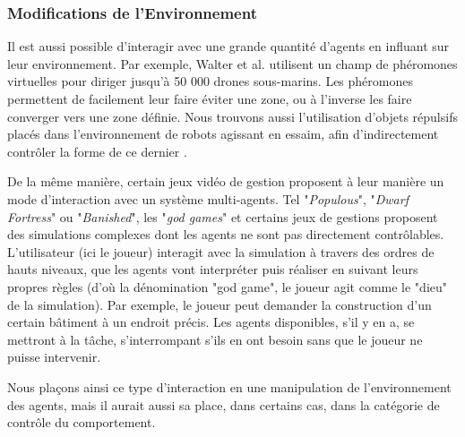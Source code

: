		
		
	\subsubsection{Modifications de l'Environnement}
		Il est aussi possible d'interagir avec une grande quantité d'agents en influant sur leur environnement. Par exemple, Walter et al. \cite{walter_uav_2006} utilisent un champ de phéromones virtuelles pour diriger jusqu'à 50 000 drones sous-marins. Les phéromones permettent de facilement leur faire éviter une zone, ou à l'inverse les faire converger vers une zone définie. Nous trouvons aussi l'utilisation d'objets répulsifs placés dans l'environnement de robots agissant en essaim, afin d'indirectement contrôler la forme de ce dernier \cite{jung_multi-robot_2013}.	
	
		De la même manière, certain jeux vidéo de gestion proposent à leur manière un mode d'interaction avec un système multi-agents. Tel "\textit{Populous}", "\textit{Dwarf Fortress}" ou "\textit{Banished}", les "\textit{god games}" et certains jeux de gestions proposent des simulations complexes dont les agents ne sont pas directement contrôlables. L'utilisateur (ici le joueur) interagit avec la simulation à travers des ordres de hauts niveaux, que les agents vont interpréter puis réaliser en suivant leurs propres règles (d'où la dénomination "god game", le joueur agit comme le "dieu" de la simulation). Par exemple, le joueur peut demander la construction d'un certain bâtiment à un endroit précis. Les agents disponibles, s'il y en a, se mettront à la tâche, s'interrompant s'ils en ont besoin sans que le joueur ne puisse intervenir. 
		
		Nous plaçons ainsi ce type d'interaction en une manipulation de l'environnement des agents, mais il aurait aussi sa place, dans certains cas, dans la catégorie de contrôle du comportement.
	
